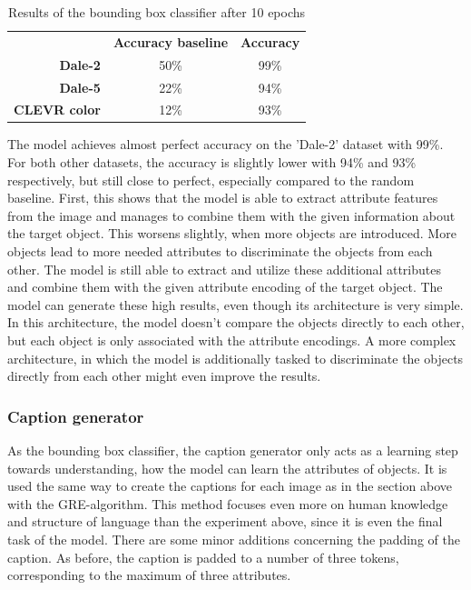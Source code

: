 \begin{table}[h]
    \centering
    \begin{tabular}{rcc}
        \toprule
                             & \textbf{Accuracy baseline} & \textbf{Accuracy} \\
        \textbf{Dale-2}      & 50\%                       & 99\%              \\
        \textbf{Dale-5}      & 22\%                       & 94\%              \\
        \textbf{CLEVR color} & 12\%                       & 93\%              \\
        \bottomrule
    \end{tabular}
    \caption{Results of the bounding box classifier after 10 epochs}
    \label{tab:results_bounding_box_classifier}
\end{table}

The model achieves almost perfect accuracy on the 'Dale-2' dataset with 99\%.
For both other datasets, the accuracy is slightly lower with 94\% and 93\% respectively, but still close to perfect, especially compared to the random baseline.
First, this shows that the model is able to extract attribute features from the image and manages to combine them with the given information about the target object.
This worsens slightly, when more objects are introduced.
More objects lead to more needed attributes to discriminate the objects from each other.
The model is still able to extract and utilize these additional attributes and combine them with the given attribute encoding of the target object.
The model can generate these high results, even though its architecture is very simple.
In this architecture, the model doesn't compare the objects directly to each other, but each object is only associated with the attribute encodings.
A more complex architecture, in which the model is additionally tasked to discriminate the objects directly from each other might even improve the results.

\subsubsection{Caption generator}

As the bounding box classifier, the caption generator only acts as a learning step towards understanding, how the model can learn the attributes of objects.
It is used the same way to create the captions for each image as in the section above with the GRE-algorithm.
This method focuses even more on human knowledge and structure of language than the experiment above, since it is even the final task of the model.
There are some minor additions concerning the padding of the caption.
As before, the caption is padded to a number of three tokens, corresponding to the maximum of three attributes.

